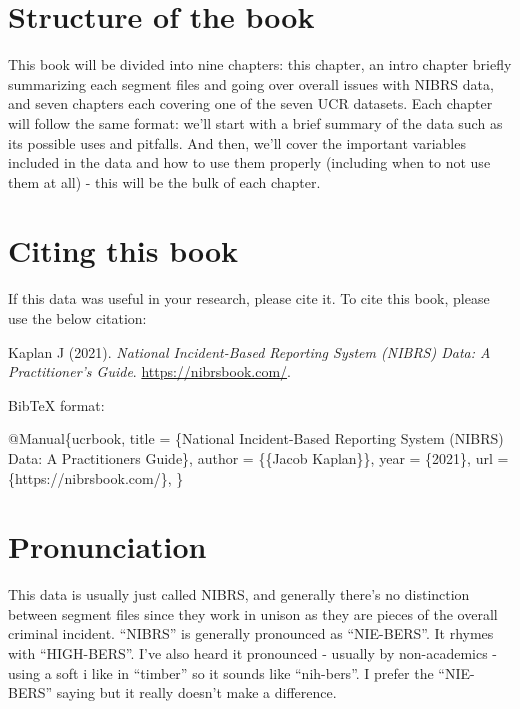 \documentclass[
  12pt,
  openany]{book}
\newenvironment{Shaded}{\begin{snugshade}}{\end{snugshade}}
\newcommand{\DataTypeTok}[1]{\textcolor[rgb]{0.27,0.27,0.27}{#1}}
\newcommand{\NormalTok}[1]{#1}
\newcommand{\OtherTok}[1]{\textcolor[rgb]{0.37,0.37,0.37}{#1}}
\newcommand{\VariableTok}[1]{\textcolor[rgb]{0,0,0}{#1}}
\begin{document}
\hypertarget{structure-of-the-book}{%
\section{Structure of the book}\label{structure-of-the-book}}

This book will be divided into nine chapters: this chapter, an intro chapter briefly summarizing each segment files and going over overall issues with NIBRS data, and seven chapters each covering one of the seven UCR datasets. Each chapter will follow the same format: we'll start with a brief summary of the data such as its possible uses and pitfalls. And then, we'll cover the important variables included in the data and how to use them properly (including when to not use them at all) - this will be the bulk of each chapter.

\hypertarget{citing-this-book}{%
\section{Citing this book}\label{citing-this-book}}

If this data was useful in your research, please cite it. To cite this book, please use the below citation:

Kaplan J (2021). \emph{National Incident-Based Reporting System (NIBRS) Data: A Practitioner's Guide}. \url{https://nibrsbook.com/}.

BibTeX format:

\begin{Shaded}
\begin{Highlighting}[]
\VariableTok{@Manual}\NormalTok{\{}\OtherTok{ucrbook}\NormalTok{,}
  \DataTypeTok{title}\NormalTok{ = \{National Incident{-}Based Reporting System (NIBRS) Data: A Practitioner\textquotesingle{}s Guide\},}
  \DataTypeTok{author}\NormalTok{ = \{\{Jacob Kaplan\}\},}
  \DataTypeTok{year}\NormalTok{ = \{2021\},}
  \DataTypeTok{url}\NormalTok{ = \{https://nibrsbook.com/\},}
\NormalTok{\}}
\end{Highlighting}
\end{Shaded}

\hypertarget{pronunciation}{%
\section{Pronunciation}\label{pronunciation}}

This data is usually just called NIBRS, and generally there's no distinction between segment files since they work in unison as they are pieces of the overall criminal incident. ``NIBRS'' is generally pronounced as ``NIE-BERS''. It rhymes with ``HIGH-BERS''. I've also heard it pronounced - usually by non-academics - using a soft i like in ``timber'' so it sounds like ``nih-bers''. I prefer the ``NIE-BERS'' saying but it really doesn't make a difference.
\end{document}
